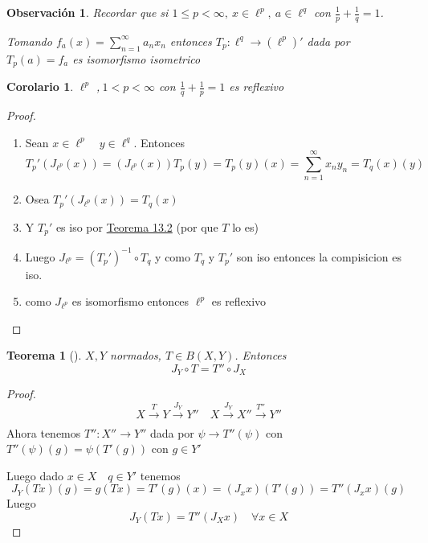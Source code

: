 \documentclass[10pt]{extarticle}
\theoremstyle{break}
\newtheorem{theorem}{Teorema}[section]
\newtheorem{corollary}{Corolario}[theorem]
\newtheorem*{remark}{Observación}
\theoremstyle{definition}
\begin{document}
\begin{remark}
	Recordar que si $1\leq p<\infty, \ x\in \ell^p, \ a\in \ell^{q} $ con $\frac{1}{p}+\frac{1}{q}=1$. 

	Tomando $f_{a}(x)=\sum_{n=1}^{\infty} a_{n} x_{n} $ entonces $T_{p}:\ell^{q} \longrightarrow (\ell^{p} )' $ dada por $T_{p}(a)=f_{a}$  es isomorfismo isometrico
\end{remark}

\begin{corollary}
	$\ell^{p} $ ,$\ 1<p<\infty$ con $\frac{1}{q}+\frac{1}{p}=1$ es reflexivo 
\end{corollary}

\begin{proof}
	\begin{enumerate}	
		\item Sean $x\in\ell^{p} \quad y\in \ell^{q}$. Entonces 
			$$T_{p}'(J_{\ell^{p}}(x))=(J_{\ell^{p} }(x))T_{p}(y)=T_{p}(y)(x)=\sum_{n=1}^{\infty} x_{n} y_{n} =T_{q}(x)(y)$$ 

		\item Osea $T_{p}'(J_{\ell^{p} }(x))=T_{q}(x)	$
		\item Y $T_{p}'$ es iso por \hyperref[13.2]{Teorema 13.2} (por que $T$ lo es)  
		\item Luego $J_{\ell^{p} }=( T_{p}' )^{-1} \circ T_{q}$ y como $T_{q}$ y $T_{p}'$ son iso entonces la compisicion es iso. 
		\item como $J_{\ell^{p} }$ es isomorfismo entonces $\ell^{p} $ es reflexivo 
	\end{enumerate}
\end{proof}

\begin{theorem}[]
	$X,Y$ normados, $T\in B(X,Y)$. Entonces 
	\begin{equation}J_{Y}\circ T=T'' \circ J_{X}\label{1}\tag{1}\end{equation}
\end{theorem}

\begin{proof}
	$$X\xrightarrow[]{T}Y\xrightarrow[]{J_{Y}}Y''\quad X\xrightarrow[]{J_{Y}}X''\xrightarrow[]{T''}Y''$$ 
	Ahora tenemos $T'':X''\longrightarrow Y''$ dada por $\psi\longrightarrow T''(\psi)$ con $T''(\psi)(g)=\psi(T'(g))$ con $g\in Y' $   

	Luego dado $x\in X\quad q\in Y'$ tenemos $$J_{Y}(Tx)(g)=g(Tx)=T'(g)(x)=(J_{x}x)(T'(g))=T''(J_{x}x)(g)$$  
	Luego $$J_{Y}(Tx)=T''(J_{X}x)\quad \forall x\in X $$  
\end{proof}
\end{document}
